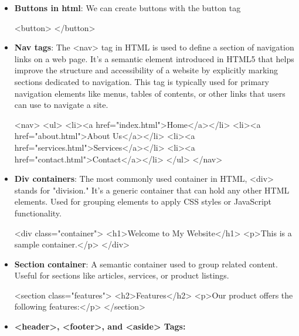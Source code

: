 \documentclass{report}
\begin{document}
\begin{itemize}
    \item \textbf{Buttons in html}: We can create buttons with the button tag
        \bigbreak \noindent 
        \begin{htmlcode}
            <button> </button>
        \end{htmlcode}
    \item \textbf{Nav tags}: The <nav> tag in HTML is used to define a section of navigation links on a web page. It’s a semantic element introduced in HTML5 that helps improve the structure and accessibility of a website by explicitly marking sections dedicated to navigation. This tag is typically used for primary navigation elements like menus, tables of contents, or other links that users can use to navigate a site.
        \bigbreak \noindent 
        \begin{htmlcode}
            <nav>
                <ul>
                    <li><a href="index.html">Home</a></li>
                    <li><a href="about.html">About Us</a></li>
                    <li><a href="services.html">Services</a></li>
                    <li><a href="contact.html">Contact</a></li>
                </ul>
            </nav>
        \end{htmlcode}
    \item \textbf{Div containers}: The most commonly used container in HTML, <div> stands for "division."
        \bigbreak \noindent 
        It’s a generic container that can hold any other HTML elements.
        \bigbreak \noindent 
        Used for grouping elements to apply CSS styles or JavaScript functionality.
        \bigbreak \noindent 
        \begin{htmlcode}
            <div class="container">
                <h1>Welcome to My Website</h1>
                <p>This is a sample container.</p>
            </div>
        \end{htmlcode}
    \item \textbf{Section container}: A semantic container used to group related content.
        \bigbreak \noindent 
        Useful for sections like articles, services, or product listings.
        \bigbreak \noindent 
        \begin{htmlcode}
            <section class="features">
                <h2>Features</h2>
                <p>Our product offers the following features:</p>
            </section>
        \end{htmlcode}
    \item \textbf{<header>, <footer>, and <aside> Tags:}
        \begin{itemize}

\end{itemize}
\end{itemize}
\end{document}
